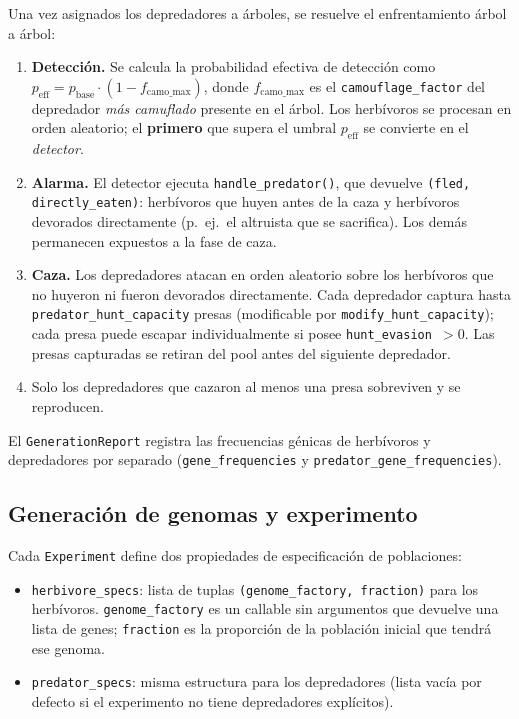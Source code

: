 \documentclass[11pt,a4paper]{article}
\begin{document}
Una vez asignados los depredadores a \'arboles, se resuelve el enfrentamiento árbol a árbol:
\begin{enumerate}
    \item \textbf{Detecci\'on.} Se calcula la probabilidad efectiva de detecci\'on como
    $p_\text{eff} = p_\text{base} \cdot (1 - f_\text{camo\_max})$, donde $f_\text{camo\_max}$
    es el \texttt{camouflage\_factor} del depredador \emph{m\'as camuflado} presente en el
    \'arbol. Los herb\'ivoros se procesan en orden aleatorio; el \textbf{primero} que supera el
    umbral $p_\text{eff}$ se convierte en el \textit{detector}.
    \item \textbf{Alarma.} El detector ejecuta \texttt{handle\_predator()}, que devuelve
    \texttt{(fled, directly\_eaten)}: herb\'ivoros que huyen antes de la caza y herb\'ivoros
    devorados directamente (p.~ej.\ el altruista que se sacrifica). Los dem\'as permanecen
    expuestos a la fase de caza.
    \item \textbf{Caza.} Los depredadores atacan en orden aleatorio sobre los herb\'ivoros que
    no huyeron ni fueron devorados directamente. Cada depredador captura hasta
    \texttt{predator\_hunt\_capacity} presas (modificable por \texttt{modify\_hunt\_capacity});
    cada presa puede escapar individualmente si posee \texttt{hunt\_evasion $> 0$}.
    Las presas capturadas se retiran del pool antes del siguiente depredador.
    \item Solo los depredadores que cazaron al menos una presa sobreviven y se reproducen.
\end{enumerate}

El \texttt{GenerationReport} registra las frecuencias g\'enicas de herb\'ivoros y depredadores
por separado (\texttt{gene\_frequencies} y \texttt{predator\_gene\_frequencies}).

\subsection{Generaci\'on de genomas y experimento}

Cada \texttt{Experiment} define dos propiedades de especificaci\'on de poblaciones:
\begin{itemize}
	\item \texttt{herbivore\_specs}: lista de tuplas \texttt{(genome\_factory, fraction)} para los
	herb\'ivoros. \texttt{genome\_factory} es un callable sin argumentos que devuelve una lista de genes;
	\texttt{fraction} es la proporci\'on de la poblaci\'on inicial que tendr\'a ese genoma.
	\item \texttt{predator\_specs}: misma estructura para los depredadores (lista vac\'ia por defecto
	si el experimento no tiene depredadores expl\'icitos).
\end{itemize}
\end{document}
